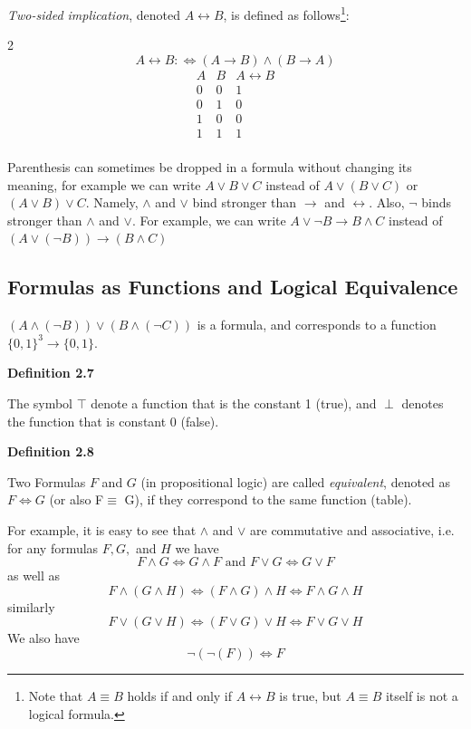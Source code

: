 \documentclass[a4paper]{report}
\newenvironment{definition}[1]{\begin{framed}\centerline{\textbf{Definition #1}}\noindent\hspace{-1.1mm}}{\end{framed}}
\begin{document}
\emph{Two-sided implication}, denoted $A\leftrightarrow B$, is defined as follows\footnote{Note that $A\equiv B$ holds if and only if $A\leftrightarrow B$ is true, but $A\equiv B$ itself is not a logical formula.}: 
\begin{multicols}{2}
\null\vfill
\[A\leftrightarrow B:\Longleftrightarrow (A\to B)\land (B\to A)\]
\null\vfill
\columnbreak
\null\vfill
\begin{displaymath}
\begin{array}{c|c||c}
   A
 & B
 & A\leftrightarrow B \\
\hline
0 & 0 & 1 \\
0 & 1 & 0 \\
1 & 0 & 0 \\
1 & 1 & 1 \\
\end{array}
\end{displaymath}
\null\vfill
\end{multicols}
Parenthesis can sometimes be dropped in a formula without changing its meaning, for example we can write $A\lor B\lor C$ instead of $A\lor (B\lor C)$ or $(A\lor B)\lor C$. Namely, $\land$ and $\lor$ bind stronger than $\to$ and $\leftrightarrow$. Also, $\lnot$ binds stronger than $\land$ and $\lor$. For example, we can write $A\lor \lnot B\to B\land C$ instead of $(A\lor (\lnot B))\to (B\land C)$
\subsection{Formulas as Functions and Logical Equivalence}
$(A\land (\lnot B))\lor (B\land(\lnot C))$ is a formula, and corresponds to a function $\{ 0,1\}^3\to\{ 0,1\}$.
\begin{definition}{2.7}
The symbol $\top$ denote a function that is the constant 1 (true), and $\perp$ denotes the function that is constant 0 (false).
\end{definition}
\begin{definition}{2.8}
Two Formulas $F$ and $G$ (in propositional logic) are called \emph{equivalent}, denoted as $F\Longleftrightarrow G$ (or also F$\equiv$ G), if they correspond to the same function (table).
\end{definition}
For example, it is easy to see that $\land$ and $\lor$ are commutative and associative, i.e. for any formulas $F,G,$ and $H$ we have 
\[F\land G\Longleftrightarrow G\land F \text{ and }  F\lor G\Longleftrightarrow G\lor F\]
as well as
\[ F\land (G\land H)\Longleftrightarrow (F\land G)\land H\Longleftrightarrow F\land G\land H\]
similarly 
\[ F\lor (G\lor H)\Longleftrightarrow (F\lor G)\lor H\Longleftrightarrow F\lor G\lor H\]
We also have 
\[\lnot( \lnot (F))\Longleftrightarrow F   \]
\end{document}
